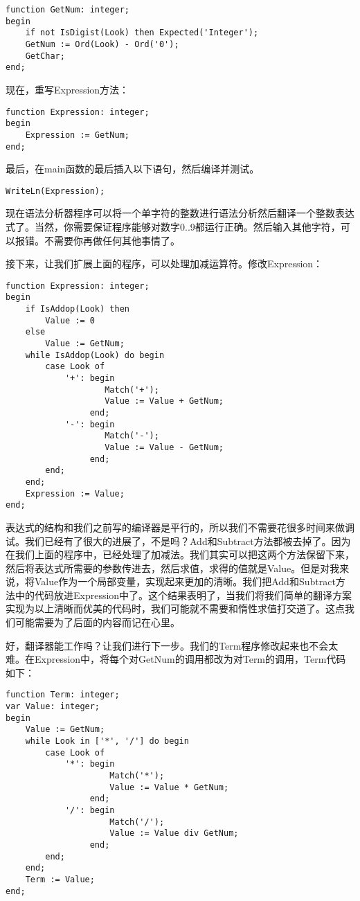 \begin{verbatim}
function GetNum: integer;
begin
    if not IsDigist(Look) then Expected('Integer');
    GetNum := Ord(Look) - Ord('0');
    GetChar;
end;
\end{verbatim}

现在，重写Expression方法：

\begin{verbatim}
function Expression: integer;
begin
    Expression := GetNum;
end;
\end{verbatim}

最后，在main函数的最后插入以下语句，然后编译并测试。

\begin{verbatim}
WriteLn(Expression);
\end{verbatim}

现在语法分析器程序可以将一个单字符的整数进行语法分析然后翻译一个整数表达式了。当然，你需要保证程序能够对数字0..9都运行正确。然后输入其他字符，可以报错。不需要你再做任何其他事情了。

接下来，让我们扩展上面的程序，可以处理加减运算符。修改Expression：

\begin{verbatim}
function Expression: integer;
begin
    if IsAddop(Look) then
        Value := 0
    else
        Value := GetNum;
    while IsAddop(Look) do begin
        case Look of
            '+': begin
                    Match('+');
                    Value := Value + GetNum;
                 end;
            '-': begin
                    Match('-');
                    Value := Value - GetNum;
                 end;
        end;
    end;
    Expression := Value;
end;
\end{verbatim}

表达式的结构和我们之前写的编译器是平行的，所以我们不需要花很多时间来做调试。我们已经有了很大的进展了，不是吗？Add和Subtract方法都被去掉了。因为在我们上面的程序中，已经处理了加减法。我们其实可以把这两个方法保留下来，然后将表达式所需要的参数传进去，然后求值，求得的值就是Value。但是对我来说，将Value作为一个局部变量，实现起来更加的清晰。我们把Add和Subtract方法中的代码放进Expression中了。这个结果表明了，当我们将我们简单的翻译方案实现为以上清晰而优美的代码时，我们可能就不需要和惰性求值打交道了。这点我们可能需要为了后面的内容而记在心里。

好，翻译器能工作吗？让我们进行下一步。我们的Term程序修改起来也不会太难。在Expression中，将每个对GetNum的调用都改为对Term的调用，Term代码如下：

\begin{verbatim}
function Term: integer;
var Value: integer;
begin
    Value := GetNum;
    while Look in ['*', '/'] do begin
        case Look of
            '*': begin
                     Match('*');
                     Value := Value * GetNum;
                 end;
            '/': begin
                     Match('/');
                     Value := Value div GetNum;
                 end;
        end;
    end;
    Term := Value;
end;
\end{verbatim}

